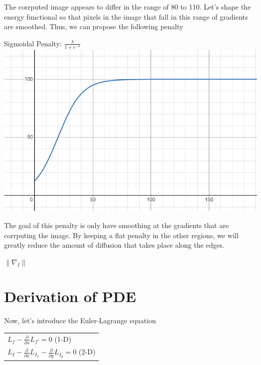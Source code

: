 \documentclass{article}
\begin{document}
  \noindent
  The corrputed image appears to differ in the range of 80 to 110.
  Let's shape the energy functional so that pixels in the image that
  fall in this range of gradients are smoothed. Thus, we
  can propose the following penalty
  \begin{center}
    Sigmoidal Penalty: $\frac{\lambda}{1+e^{-x}}$\\
    \vspace{12pt}
    \includegraphics[scale=0.5]{../report_images/sigmoid.png}
  \end{center}
  \vspace{12pt}

  \noindent
  The goal of this penalty is only have smoothing at the gradients
  that are corrputing the image. By keeping a flat penalty in the
  other regions, we will greatly reduce the amount of diffusion that
  takes place along the edges.

  \noindent
  $\| \nabla_{I} \|$













    

  \newpage
  \section{Derivation of PDE}

    \noindent Now, let's introduce the Euler-Lagrange equation
      \begin{center}
        \begin{tabular}{l}
          $L_{f} - \frac{\partial}{\partial x}L_{f'} = 0$ (1-D)\\
          $L_{I} - \frac{\partial}{\partial x}L_{I_{x}} - \frac{\partial}{\partial y}L_{I_{y}} = 0$ (2-D)\\
        \end{tabular}
      \end{center}
    \vspace{12pt}
\end{document}
